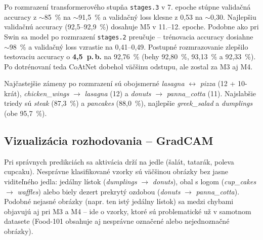 
Po rozmrazení transformerového stupňa \texttt{stages.3} v 7. epoche stúpne
validačná accuracy z $\sim$85~\% na $\sim$91,5~\% a validačný loss klesne
z 0,53 na $\sim$0,30. Najlepšiu validačnú accuracy (92,5--92,9~\%) dosahuje
M5 v 11.--12. epoche. Podobne ako pri Swin sa model po rozmrazení
\texttt{stages.2} preučuje -- trénovacia accuracy dosiahne $\sim$98~\%
a validačný loss vzrastie na 0,41--0,49. Postupné rozmrazovanie zlepšilo
testovaciu accuracy o \textbf{4,5~p.\,b.} na 92,76~\% (behy 92,80~\%,
93,13~\% a 92,33~\%). Po dotrénovaní teda CoAtNet dobehol väčšinu
odstupu, ale zostal za M3 aj M4.


Najčastejšie zámeny po rozmrazení sú obojsmerné \emph{lasagna}
$\leftrightarrow$ \emph{pizza} (12 + 10-krát), \emph{chicken\_wings}
$\rightarrow$ \emph{lasagna} (12) a \emph{donuts} $\rightarrow$
\emph{panna\_cotta} (11). Najslabšie triedy sú \emph{steak} (87,3~\%)
a \emph{pancakes} (88,0~\%), najlepšie \emph{greek\_salad}
a \emph{dumplings} (obe 95,7~\%).

\subsection{Vizualizácia rozhodovania -- GradCAM}


Pri správnych predikciách sa aktivácia drží na jedle (šalát, tatarák,
poleva cupcaku). Nesprávne klasifikované vzorky sú väčšinou obrázky bez
jasne viditeľného jedla: jedálny lístok (\emph{dumplings} $\rightarrow$
\emph{donuts}), obal s logom (\emph{cup\_cakes} $\rightarrow$
\emph{waffles}) alebo biely dezert prekrytý ozdobou (\emph{donuts}
$\rightarrow$ \emph{panna\_cotta}). Podobné nejasné obrázky (napr. ten istý
jedálny lístok) sa medzi chybami objavujú aj pri M3 a M4 -- ide
o vzorky, ktoré sú problematické už v samotnom datasete (Food-101 obsahuje
aj nesprávne označené alebo nejednoznačné obrázky).

